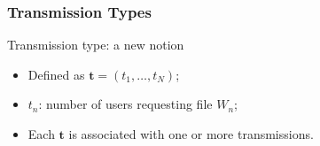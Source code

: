 \documentclass{beamer}
\begin{document}
\begin{frame}
\frametitle{Transmission Types}
Transmission type: a new notion 
\begin{itemize}
	\item Defined as $\boldsymbol{t}=(t_1,\ldots,t_N)$;
	\item $t_n$: number of users requesting file $W_n$;
	\item Each $\boldsymbol{t}$ is associated with one or more transmissions.
\end{itemize}
\vspace{30pt}

\end{frame}


%
\end{document}
